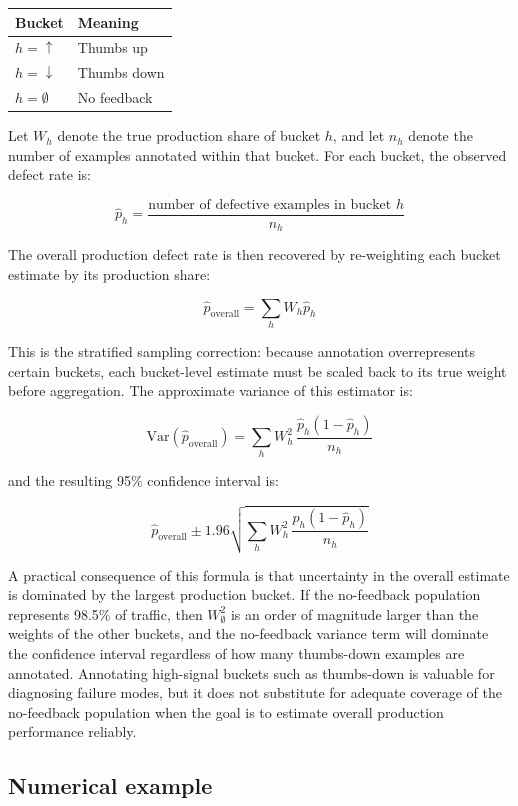 \begin{center}
\begin{tabular}{ll}
\toprule
\textbf{Bucket} & \textbf{Meaning} \\
\midrule
$h = \uparrow$   & Thumbs up \\
$h = \downarrow$ & Thumbs down \\
$h = \emptyset$  & No feedback \\
\bottomrule
\end{tabular}
\end{center}

Let $W_h$ denote the true production share of bucket $h$, and let $n_h$ denote the number 
of examples annotated within that bucket. For each bucket, the observed defect rate is:

\[
\hat{p}_h = \frac{\text{number of defective examples in bucket } h}{n_h}
\]

The overall production defect rate is then recovered by re-weighting each bucket estimate 
by its production share:

\[
\hat{p}_{\text{overall}} = \sum_h W_h \hat{p}_h
\]

This is the stratified sampling correction: because annotation overrepresents certain 
buckets, each bucket-level estimate must be scaled back to its true weight before 
aggregation. The approximate variance of this estimator is:

\[
\mathrm{Var}(\hat{p}_{\text{overall}}) = \sum_h W_h^2 \, \frac{\hat{p}_h(1 - \hat{p}_h)}{n_h}
\]

and the resulting 95\% confidence interval is:

\[
\hat{p}_{\text{overall}} \pm 1.96 \sqrt{\sum_h W_h^2 \, \frac{\hat{p}_h(1 - \hat{p}_h)}{n_h}}
\]

A practical consequence of this formula is that uncertainty in the overall estimate is 
dominated by the largest production bucket. If the no-feedback population represents 98.5\% 
of traffic, then $W_{\emptyset}^2$ is an order of magnitude larger than the weights of the 
other buckets, and the no-feedback variance term will dominate the confidence interval 
regardless of how many thumbs-down examples are annotated. Annotating high-signal buckets 
such as thumbs-down is valuable for diagnosing failure modes, but it does not substitute 
for adequate coverage of the no-feedback population when the goal is to estimate overall 
production performance reliably.

\subsection*{Numerical example}

